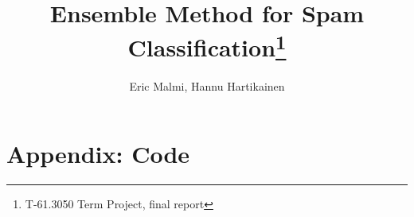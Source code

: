 \documentclass[12pt,a4paper,finnish,oneside]{article}
\begin{document}


\pagestyle{plain}



\author{Eric Malmi, Hannu Hartikainen}
\title{Ensemble Method for Spam Classification\thanks{T-61.3050 Term Project, final report}}

\maketitle



\clearpage




\clearpage



\tableofcontents
\label{pages-prelude}
\clearpage



\pagestyle{headings}








\clearpage



\nocite{*}


%





\newpage
\section*{Appendix: Code}






%
\end{document}
